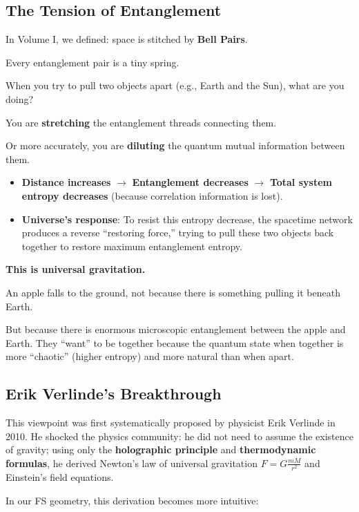 \subsection{The Tension of Entanglement}

In Volume I, we defined: space is stitched by \textbf{Bell Pairs}.

Every entanglement pair is a tiny spring.

When you try to pull two objects apart (e.g., Earth and the Sun), what are you doing?

You are \textbf{stretching} the entanglement threads connecting them.

Or more accurately, you are \textbf{diluting} the quantum mutual information between them.

\begin{itemize}
\item \textbf{Distance increases} $\rightarrow$ \textbf{Entanglement decreases} $\rightarrow$ \textbf{Total system entropy decreases} (because correlation information is lost).

\item \textbf{Universe's response}: To resist this entropy decrease, the spacetime network produces a reverse ``restoring force,'' trying to pull these two objects back together to restore maximum entanglement entropy.
\end{itemize}

\textbf{This is universal gravitation.}

An apple falls to the ground, not because there is something pulling it beneath Earth.

But because there is enormous microscopic entanglement between the apple and Earth. They ``want'' to be together because the quantum state when together is more ``chaotic'' (higher entropy) and more natural than when apart.

\subsection{Erik Verlinde's Breakthrough}

This viewpoint was first systematically proposed by physicist Erik Verlinde in 2010. He shocked the physics community: he did not need to assume the existence of gravity; using only the \textbf{holographic principle} and \textbf{thermodynamic formulas}, he derived Newton's law of universal gravitation $F = G \frac{mM}{r^2}$ and Einstein's field equations.

In our FS geometry, this derivation becomes more intuitive:

